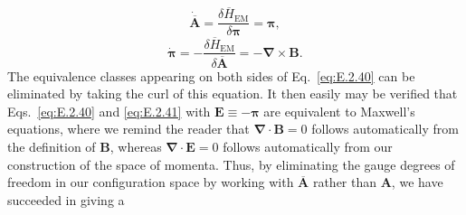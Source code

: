 \begin{equation}
  \dot{\overline{\mathbf{A}}}
    =\frac{\delta\overline H_{\mathrm{EM}}}{\delta\boldsymbol{\pi}}=\boldsymbol{\pi},
  \tag{E.2.40}\label{eq:E.2.40}
\end{equation}
\begin{equation}
  \dot{\boldsymbol{\pi}}
    =-\frac{\delta\overline H_{\mathrm{EM}}}{\delta\overline{\mathbf{A}}}
    =-\boldsymbol{\nabla}\times\mathbf{B}.
  \tag{E.2.41}\label{eq:E.2.41}
\end{equation}
The equivalence classes appearing on both sides of Eq.~\eqref{eq:E.2.40} can be
eliminated by taking the curl of this equation. It then easily may be verified that
Eqs.~\eqref{eq:E.2.40} and \eqref{eq:E.2.41} with
\(\mathbf{E}\equiv-\boldsymbol{\pi}\) are equivalent to Maxwell's equations, where we remind
the reader that \(\boldsymbol{\nabla}\cdot\mathbf{B}=0\) follows automatically from the
definition of \(\mathbf{B}\), whereas \(\boldsymbol{\nabla}\cdot\mathbf{E}=0\) follows automatically
from our construction of the space of momenta. Thus, by eliminating the gauge
degrees of freedom in our configuration space by working with
\(\overline{\mathbf{A}}\) rather than \(\mathbf{A}\), we have succeeded in giving a
